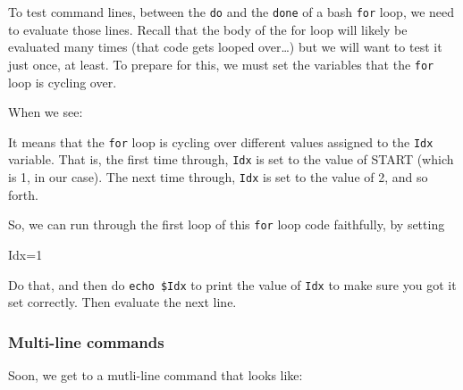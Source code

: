 \documentclass[]{krantz}
\makeatletter
\newenvironment{Shaded}{\begin{snugshade}}{\end{snugshade}}
\newcommand{\FunctionTok}[1]{\textcolor[rgb]{0,0,0}{#1}}
\newcommand{\KeywordTok}[1]{\textcolor[rgb]{0.27,0.27,0.27}{\textbf{#1}}}
\newcommand{\NormalTok}[1]{#1}
\newcommand{\StringTok}[1]{\textcolor[rgb]{0.5,0.5,0.5}{#1}}
\newcommand{\VariableTok}[1]{\textcolor[rgb]{0,0,0}{#1}}
\newenvironment{kframe}{%
\medskip{}
\setlength{\fboxsep}{.8em}
 \def\at@end@of@kframe{}%
 \ifinner\ifhmode%
  \def\at@end@of@kframe{\end{minipage}}%
  \begin{minipage}{\columnwidth}%
 \fi\fi%
 \def\FrameCommand##1{\hskip\@totalleftmargin \hskip-\fboxsep
 \colorbox{shadecolor}{##1}\hskip-\fboxsep
     \hskip-\linewidth \hskip-\@totalleftmargin \hskip\columnwidth}%
 \MakeFramed {\advance\hsize-\width
   \@totalleftmargin\z@ \linewidth\hsize
   \@setminipage}}%
 {\par\unskip\endMakeFramed%
 \at@end@of@kframe}
\renewenvironment{Shaded}{\begin{kframe}}{\end{kframe}}
\makeatother
\begin{document}
To test command lines, between the \texttt{do} and the \texttt{done} of a bash \texttt{for} loop, we need
to evaluate those lines. Recall that the body of the for loop will likely be evaluated
many times (that code gets looped over\ldots{}) but we will want to test it just once, at
least. To prepare for this, we must set the variables that the \texttt{for} loop is cycling over.

When we see:

\begin{Shaded}
\end{Shaded}

It means that the \texttt{for} loop is cycling over different values assigned to the
\texttt{Idx} variable. That is, the first time through, \texttt{Idx} is set to the value of
START (which is 1, in our case). The next time through, \texttt{Idx} is set to the
value of 2, and so forth.

So, we can run through the first loop of this \texttt{for} loop code faithfully, by setting

\begin{Shaded}
\begin{Highlighting}[]
\VariableTok{Idx=}\NormalTok{1}
\end{Highlighting}
\end{Shaded}

Do that, and then do \texttt{echo\ \$Idx} to print the value of \texttt{Idx} to make sure you got it set
correctly. Then evaluate the next line.

\hypertarget{multi-line-commands}{%
\subsubsection{Multi-line commands}\label{multi-line-commands}}

Soon, we get to a mutli-line command that looks like:

\begin{Shaded}
\end{Shaded}
\end{document}
